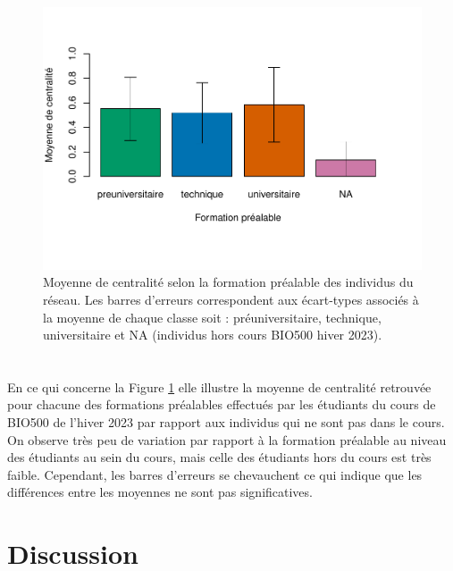 \documentclass[preprint, 3p,
authoryear]{elsarticle} %
\begin{document}
\hypertarget{section-4}{%
\section{}\label{section-4}}

\begin{figure}
\centering
\includegraphics{rapport_files/figure-latex/unnamed-chunk-3-1.pdf}
\caption{\label{fig:plot3}Moyenne de centralité selon la formation
préalable des individus du réseau. Les barres d'erreurs correspondent
aux écart-types associés à la moyenne de chaque classe soit :
préuniversitaire, technique, universitaire et NA (individus hors cours
BIO500 hiver 2023).}
\end{figure}

\hypertarget{section-5}{%
\section{}\label{section-5}}

En ce qui concerne la Figure \ref{fig:plot3} elle illustre la moyenne de
centralité retrouvée pour chacune des formations préalables effectués
par les étudiants du cours de BIO500 de l'hiver 2023 par rapport aux
individus qui ne sont pas dans le cours. On observe très peu de
variation par rapport à la formation préalable au niveau des étudiants
au sein du cours, mais celle des étudiants hors du cours est très
faible. Cependant, les barres d'erreurs se chevauchent ce qui indique
que les différences entre les moyennes ne sont pas significatives.

\hypertarget{discussion}{%
\section{Discussion}\label{discussion}}
\end{document}
